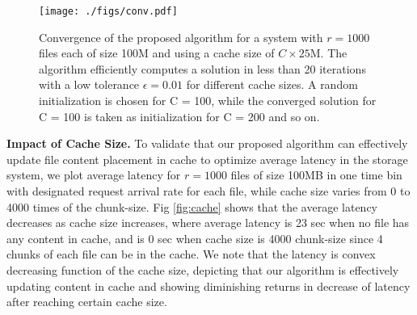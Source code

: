 
\begin{figure}[!thbp]
\vspace{-2mm}
\begin{center}
{\texttt{[image: ./figs/conv.pdf]}}
\vspace{-3mm}
\caption{Convergence of the proposed algorithm for a system with $r = 1000$ files each of size 100M and using a cache size of $C\times 25$M. The algorithm efficiently computes a solution in less than 20 iterations with a low tolerance $\epsilon = 0.01$ for different cache sizes.  A random initialization is chosen for C = 100, while the converged solution for C = 100 is taken as initialization for C = 200 and so on.}
\label{fig:conv}
\end{center}
\vspace{-.2in}
\end{figure}

{\bf Impact of Cache Size.} To validate that our proposed algorithm can effectively update file content placement in cache to optimize average latency in the storage system, we plot average latency for $r=1000$ files of size 100MB in one time bin with designated request arrival rate for each file, while cache size varies from 0 to 4000 times of the chunk-size. Fig \ref{fig:cache} shows that the average latency decreases as cache size increases, where average latency is 23 sec when no file has any content in cache, and is 0 sec when cache size is 4000 chunk-size since 4 chunks of each file can be in the cache. We note that the latency is convex decreasing function of the cache size, depicting that our algorithm is effectively updating content in cache and showing diminishing returns in decrease of latency after reaching certain cache size.


